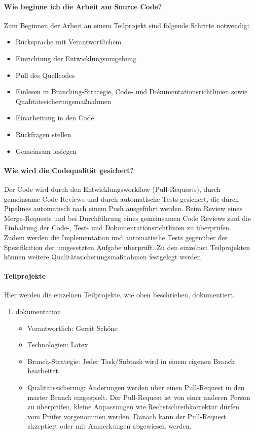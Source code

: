\paragraph{Wie beginne ich die Arbeit am Source Code?}
Zum Beginnen der Arbeit an einem Teilprojekt sind folgende Schritte notwendig:
\begin{itemize}
	\item Rücksprache mit Verantwortlichem
	\item Einrichtung der Entwicklungsumgebung
	\item Pull des Quellcodes
	\item Einlesen in Branching-Strategie, Code- und Dokumentationsrichtlinien sowie Qualitätssicherungsmaßnahmen
	\item Einarbeitung in den Code
	\item Rückfragen stellen
	\item Gemeinsam loslegen
\end{itemize}

\paragraph{Wie wird die Codequalität gesichert?}
Der Code wird durch den Entwicklungsworkflow (Pull-Requests), durch gemeinsame Code Reviews und durch automatische Tests gesichert, die durch Pipelines automatisch nach einem Push ausgeführt werden. Beim Review eines Merge-Requests und bei Durchführung eines gemeinsamen Code Reviews sind die Einhaltung der Code-, Test- und Dokumentationsrichtlinien zu überprüfen. Zudem werden die Implementation und automatische Tests gegenüber der Spezifikation der umgesetzten Aufgabe überprüft. Zu den einzelnen Teilprojekten können weitere Qualitätssicherungsmaßnahmen festgelegt werden.

\paragraph{Teilprojekte}
Hier werden die einzelnen Teilprojekte, wie oben beschrieben, dokumentiert.

\begin{enumerate}
	\item dokumentation
	\begin{itemize}
		\item Verantwortlich: Gerrit Schöne
		\item Technologien: Latex
		\item Branch-Strategie: Jeder Task/Subtask wird in einem eigenen Branch bearbeitet.
		\item Qualitätssicherung: Änderungen werden über einen Pull-Request in den master Branch eingespielt. Der Pull-Request ist von einer anderen Person zu überprüfen, kleine Anpassungen wie Rechstschreibkorrektur dürfen vom Prüfer vorgenommen werden. Danach kann der Pull-Request akzeptiert oder mit Anmerkungen abgewiesen werden.
	\end{itemize}
\end{enumerate}


